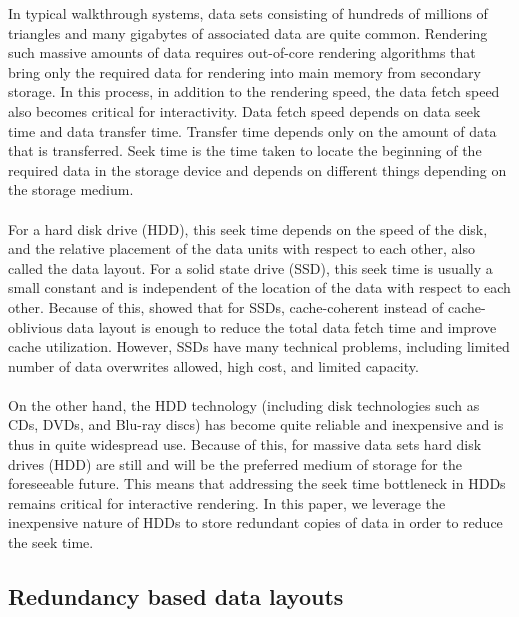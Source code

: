\documentclass[conference]{acmsiggraph}
\begin{document}
In typical walkthrough systems, data sets consisting of hundreds of millions of triangles and many gigabytes of associated data are quite common. Rendering such massive amounts of data requires out-of-core rendering algorithms that bring only the required data for rendering into main memory from secondary storage. In this process, in addition to the rendering speed, the data fetch speed also becomes critical for interactivity. Data fetch speed depends on data seek time and data transfer time. Transfer time depends only on the amount of data that is transferred. Seek time is the time taken to locate the beginning of the required data in the storage device and depends on different things depending on the storage medium. \\
\\
For a hard disk drive (HDD), this seek time depends on the speed of the disk, and the relative placement of the data units with respect to each other, also called the data layout. For a solid state drive (SSD), this seek time is usually a small constant and is independent of the location of the data with respect to each other. Because of this, \cite{ssdpaper} showed that for SSDs, cache-coherent instead of cache-oblivious data layout is enough to reduce the total data fetch time and improve cache utilization. However, SSDs have many technical problems, including limited number of data overwrites allowed, high cost, and limited capacity.  \\
\\
On the other hand, the HDD  technology (including disk technologies such as CDs, DVDs, and Blu-ray discs) has become quite reliable and inexpensive and is thus in quite widespread use. Because of this, for massive data sets hard disk drives (HDD) are still and will be the preferred medium of storage for the foreseeable future. This means that addressing the seek time bottleneck in HDDs remains critical for interactive rendering. In this paper, we leverage the inexpensive nature of HDDs to store redundant copies of data in order to reduce the seek time. 

\subsection{Redundancy based data layouts}
\end{document}
